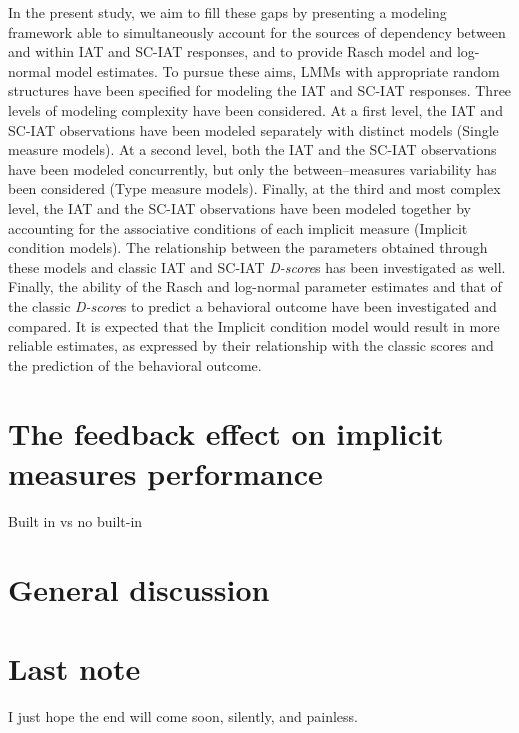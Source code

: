 \documentclass[12pt]{book}
\begin{document}
In the present study, we aim to fill these gaps by presenting a modeling framework able to simultaneously account for the sources of dependency between and within IAT and SC-IAT responses, and to provide Rasch model and log-normal model estimates. To pursue these aims, LMMs with appropriate random structures have been specified for modeling the IAT and SC-IAT responses.  Three levels of modeling complexity have been considered. At a first level, the IAT and SC-IAT observations have been modeled separately with distinct models (Single measure models). At a second level, both the IAT and the SC-IAT observations have been modeled concurrently, but only the between--measures variability has been considered (Type measure models). Finally, at the third and most complex level, the IAT and the SC-IAT observations have been modeled together by accounting for the associative conditions of each implicit measure (Implicit condition models).
The relationship between the parameters obtained through these models and classic IAT and SC-IAT \emph{D-score}s has been investigated as well. Finally, the ability of the Rasch and log-normal parameter estimates and that of the classic \emph{D-score}s to predict a behavioral outcome have been investigated and compared.
It is expected that the Implicit condition model would result in more reliable estimates, as expressed by their relationship with the classic scores and the prediction of the behavioral outcome.




\chapter{The feedback effect on implicit measures performance}
Built in vs no built-in




\chapter{General discussion}


\backmatter
\chapter{Last note}
I just hope the end will come soon, silently, and painless. 

\newpage
 
\doublespacing

\end{document}
